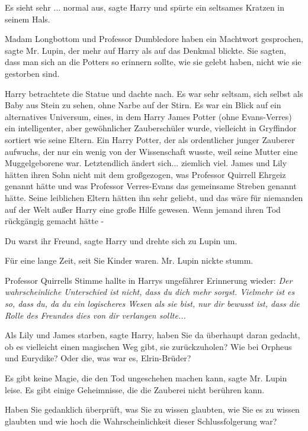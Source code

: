 \glqq{}Es sieht sehr ... normal aus\grqq{}, sagte Harry und spürte ein seltsames
Kratzen in seinem Hals.

\glqq{}Madam Longbottom und Professor Dumbledore haben ein Machtwort
gesprochen\grqq{}, sagte Mr. Lupin, der mehr auf Harry als auf das Denkmal
blickte. \glqq{}Sie sagten, dass man sich an die Potters so erinnern sollte, wie
sie gelebt haben, nicht wie sie gestorben sind.\grqq{}

Harry betrachtete die Statue und dachte nach. Es war sehr seltsam, sich selbst
als Baby aus Stein zu sehen, ohne Narbe auf der Stirn. Es war ein Blick auf ein
alternatives Universum, eines, in dem Harry James Potter (ohne Evans-Verres) ein
intelligenter, aber gewöhnlicher Zauberschüler wurde, vielleicht in Gryffindor
sortiert wie seine Eltern. Ein Harry Potter, der als ordentlicher junger
Zauberer aufwuchs, der nur ein wenig von der Wissenschaft wusste, weil seine
Mutter eine Muggelgeborene war. Letztendlich ändert sich... ziemlich viel. James
und Lily hätten ihren Sohn nicht mit dem großgezogen, was Professor Quirrell
Ehrgeiz genannt hätte und was Professor Verres-Evans das gemeinsame Streben
genannt hätte. Seine leiblichen Eltern hätten ihn sehr geliebt, und das wäre für
niemanden auf der Welt außer Harry eine große Hilfe gewesen. Wenn jemand ihren
Tod rückgängig gemacht hätte -

\glqq{}Du warst ihr Freund\grqq{}, sagte Harry und drehte sich zu Lupin um.

\glqq{}Für eine lange Zeit, seit Sie Kinder waren.\grqq{} Mr. Lupin nickte stumm.

Professor Quirrells Stimme hallte in Harrys ungefährer Erinnerung wieder:
\emph{Der wahrscheinliche Unterschied ist nicht, dass du dich mehr sorgst.
Vielmehr ist es so, dass du, da du ein logischeres Wesen als sie bist, nur dir
bewusst ist, dass die Rolle des Freundes dies von dir verlangen sollte...}

\glqq{}Als Lily und James starben\grqq{}, sagte Harry, \glqq{}haben Sie da
überhaupt daran gedacht, ob es vielleicht einen magischen Weg gibt, sie
zurückzuholen? Wie bei Orpheus und Eurydike? Oder die, was war es,
Elrin-Brüder?\grqq{}

\glqq{}Es gibt keine Magie, die den Tod ungeschehen machen kann\grqq{}, sagte Mr.
Lupin leise. \glqq{}Es gibt einige Geheimnisse, die die Zauberei nicht berühren
kann.\grqq{}

\glqq{}Haben Sie gedanklich überprüft, was Sie zu wissen glaubten, wie Sie es zu
wissen glaubten und wie hoch die Wahrscheinlichkeit dieser Schlussfolgerung
war?\grqq{}

